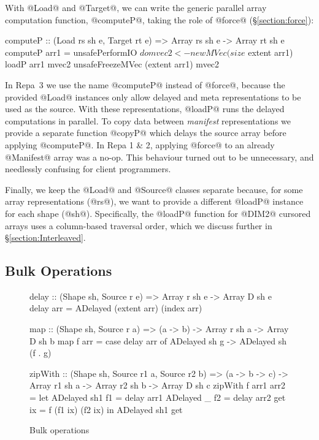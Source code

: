 With @Load@ and @Target@, we can write the generic parallel array computation function, @computeP@, taking the role of @force@ (\S\ref{section:force}):
%
\begin{small}
\begin{code}
   computeP :: (Load rs sh e, Target rt e)
            => Array rs sh e -> Array rt sh e
   computeP arr1
    = unsafePerformIO
    $ do mvec2 <- newMVec (size $ extent arr1) 
         loadP arr1 mvec2
         unsafeFreezeMVec (extent arr1) mvec2
\end{code}
\end{small}
%
In Repa~3 we use the name @computeP@ instead of @force@, because the provided @Load@ instances only allow delayed and meta representations to be used as the source. With these representations, @loadP@ runs the delayed computations in parallel. To copy data between \emph{manifest} representations we provide a separate function @copyP@ which delays the source array before applying @computeP@. In Repa 1 \& 2, applying @force@ to an already @Manifest@ array was a no-op. This behaviour turned out to be unnecessary, and needlessly confusing for client programmers.

Finally, we keep the @Load@ and @Source@ classes separate because, for some array representations (@rs@), we want to provide a different @loadP@ instance for each shape (@sh@). Specifically, the @loadP@ function for @DIM2@ cursored arrays uses a column-based traversal order, which we discuss further in \S\ref{section:Interleaved}. 


\subsection{Bulk Operations}

\begin{figure}
\begin{small}
\begin{code}
delay :: (Shape sh, Source r e)
      => Array r sh e -> Array D sh e
delay arr = ADelayed (extent arr) (index arr)

map   :: (Shape sh, Source r a)
      => (a -> b) -> Array r sh a -> Array D sh b
map f arr = case delay arr of
               ADelayed sh g -> ADelayed sh (f . g)

zipWith :: (Shape sh, Source r1 a, Source r2 b)
        => (a -> b -> c) 
        -> Array r1 sh a -> Array r2 sh b -> Array D sh c
zipWith f arr1 arr2
 = let  ADelayed sh1 f1 = delay arr1
        ADelayed _   f2 = delay arr2
        get ix = f (f1 ix) (f2 ix)
   in   ADelayed sh1 get
\end{code}
\end{small}
\caption{Bulk operations}
\label{figure:BulkOperations}
\label{figure:map}
\end{figure}

